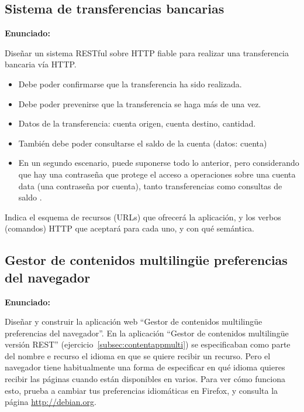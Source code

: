 \subsection{Sistema de transferencias bancarias}
\label{subsec:transferencias-bancarias}

\textbf{Enunciado:}

Diseñar un sistema RESTful sobre HTTP fiable para realizar una transferencia bancaria vía HTTP.

\begin{itemize}
\item Debe poder confirmarse que la transferencia ha sido realizada.
\item Debe poder prevenirse que la transferencia se haga más de una vez.
\item Datos de la transferencia: cuenta origen, cuenta destino, cantidad.
\item También debe poder consultarse el saldo de la cuenta (datos: cuenta)
\item En un segundo escenario, puede suponerse todo lo anterior, pero considerando que hay una contraseña que protege el acceso a operaciones sobre una cuenta data (una contraseña por cuenta), tanto transferencias como consultas de saldo
.
\end{itemize}

Indica el esquema de recursos (URLs) que ofrecerá la aplicación, y los verbos (comandos) HTTP que aceptará para cada uno, y con qué semántica.

\subsection{Gestor de contenidos multilingüe preferencias del navegador}
\label{subsec:contentappmulti-navegador}

\textbf{Enunciado:}

Diseñar y construir la aplicación web ``Gestor de contenidos multilingüe preferencias del navegador''. En la aplicación ``Gestor de contenidos multilingüe versión REST'' (ejercicio~\ref{subsec:contentappmulti}) se especificaban como parte del nombre e recurso el idioma en que se quiere recibir un recurso. Pero el navegador tiene habitualmente una forma de especificar en qué idioma quieres recibir las páginas cuando están disponibles en varios. Para ver cómo funciona esto, prueba a cambiar tus preferencias idiomáticas en Firefox, y consulta la página \url{http://debian.org}.

